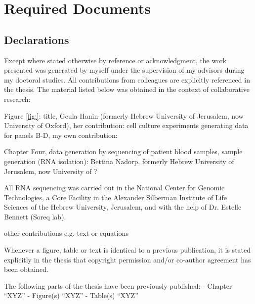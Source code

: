 \chapter{Required Documents} 
\label{appendix:req-doc}

\section{Declarations}
Except where stated otherwise by reference or acknowledgment, the work presented was generated by myself under the supervision of my advisors during my doctoral studies. All contributions from colleagues are explicitly referenced in the thesis. The material listed below was obtained in the context of collaborative research:

Figure \ref{fig:}: title, Geula Hanin (formerly Hebrew University of Jerusalem, now University of Oxford), her contribution: cell culture experiments generating data for panels B-D, my own contribution: 

Chapter Four, data generation by sequencing of patient blood samples, sample generation (RNA isolation): Bettina Nadorp, formerly Hebrew University of Jerusalem, now University of ?

All RNA sequencing was carried out in the National Center for Genomic Technologies, a Core Facility in the Alexander Silberman Institute of Life Sciences of the Hebrew University, Jerusalem, and with the help of Dr. Estelle Bennett (Soreq lab).

other contributions e.g. text or equations

Whenever a figure, table or text is identical to a previous publication, it is stated explicitly in the thesis that copyright permission and/or co-author agreement has been obtained.

The following parts of the thesis have been previously published:
- Chapter “XYZ”
- Figure(s) “XYZ”
- Table(s) “XYZ”

\newpage

